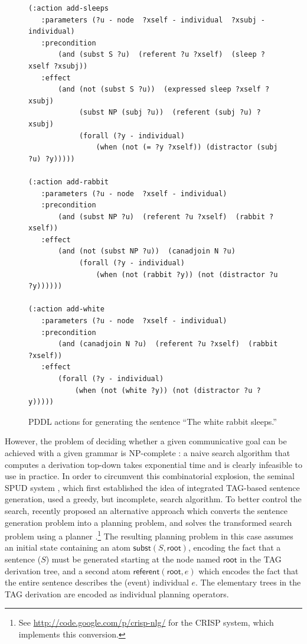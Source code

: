 \begin{figure}
\centering
\begin{minipage}{0.8\textwidth}
{\small%
\begin{verbatim}
(:action add-sleeps
   :parameters (?u - node  ?xself - individual  ?xsubj - individual)
   :precondition
       (and (subst S ?u)  (referent ?u ?xself)  (sleep ?xself ?xsubj))
   :effect 
       (and (not (subst S ?u))  (expressed sleep ?xself ?xsubj)
            (subst NP (subj ?u))  (referent (subj ?u) ?xsubj)
            (forall (?y - individual)
                (when (not (= ?y ?xself)) (distractor (subj ?u) ?y)))))

(:action add-rabbit
   :parameters (?u - node  ?xself - individual)
   :precondition 
       (and (subst NP ?u)  (referent ?u ?xself)  (rabbit ?xself))
   :effect 
       (and (not (subst NP ?u))  (canadjoin N ?u)
            (forall (?y - individual)
                (when (not (rabbit ?y)) (not (distractor ?u ?y))))))

(:action add-white
   :parameters (?u - node  ?xself - individual)
   :precondition 
       (and (canadjoin N ?u)  (referent ?u ?xself)  (rabbit ?xself))
   :effect 
       (forall (?y - individual)
           (when (not (white ?y)) (not (distractor ?u ?y)))))
\end{verbatim}}%
\end{minipage}
\caption{PDDL actions for generating the sentence ``The white rabbit
sleeps.''}
\label{fig:white-rabbit-as-planning}
\end{figure}

However, the problem of deciding whether a given communicative goal can be
achieved with a given grammar is NP-complete \citep{KolStr02}: a naive
search algorithm that computes a derivation top-down takes exponential time
and is clearly infeasible to use in practice. In order to circumvent this
combinatorial explosion, the seminal SPUD system \citep{Stone2003a}, which
first established the idea of integrated TAG-based sentence generation,
used a greedy, but incomplete, search algorithm.
%
To better control the search, \citet{KolSto07} recently proposed an
alternative approach which converts the sentence generation problem into a
planning problem, and solves the transformed search problem using a planner
\citep{KolSto07}.\footnote{See
  \url{http://code.google.com/p/crisp-nlg/} for the CRISP system, which
  implements this conversion.} The resulting planning problem in
this case assumes an initial state containing an atom
$\mathsf{subst}(S,\mathsf{root})$, encoding the fact that a sentence ($S$)
must be generated starting at the node named $\mathsf{root}$ in the TAG
derivation tree, and a second atom $\mathsf{referent}(\mathsf{root},e)$
which encodes the fact that the entire sentence describes the (event)
individual $e$. The elementary trees in the TAG derivation are encoded as
individual planning operators.

